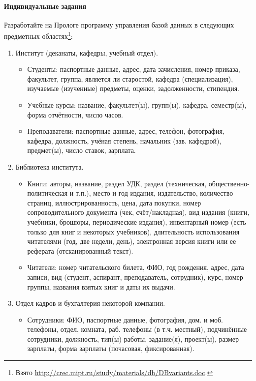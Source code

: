 \documentclass[12pt, openany, twoside]{book} %
\begin{document}
\paragraph{Индивидуальные задания}
Разработайте на Прологе программу управления базой данных в следующих предметных областях\footnote{Взято \url{http://crec.mipt.ru/study/materials/db/DBvariants.doc}.}:
\begin{enumerate}
\item Институт (деканаты, кафедры, учебный отдел).
\begin{itemize}
\item Студенты: паспортные данные, адрес, дата зачисления, номер приказа, факультет, группа, является ли старостой, кафедра (специализация), изучаемые (изученные) предметы, оценки, задолженности, стипендия.
\item Учебные курсы: название, факультет(ы), групп(ы), кафедра, семестр(ы), форма отчётности, число часов.
\item Преподаватели: паспортные данные, адрес, телефон, фотография, кафедра, должность, учёная степень, начальник (зав. кафедрой), предмет(ы), число ставок, зарплата.
\end{itemize}
\item Библиотека института.
\begin{itemize}
\item Книги: авторы, название, раздел УДК, раздел (техническая, общественно-политическая и т.п.), место и год издания, издательство, количество страниц, иллюстрированность, цена, дата покупки, номер сопроводительного документа (чек, счёт/накладная), вид издания (книги, учебники, брошюры, периодические издания), инвентарный номер (есть только для книг и некоторых учебников), длительность использования читателями (год, две недели, день), электронная версия книги или ее реферата (отсканированный текст).
\item Читатели: номер читательского билета, ФИО, год рождения, адрес, дата записи, вид (студент, аспирант, преподаватель, сотрудник), курс, номер группы, названия взятых книг и даты их выдачи.
\end{itemize}
\item Отдел кадров и бухгалтерия некоторой компании.
\begin{itemize}
\item Сотрудники: ФИО, паспортные данные, фотография, дом. и моб. телефоны, отдел, комната, раб. телефоны (в т.ч. местный), подчинённые сотрудники, должность, тип(ы) работы, задание(я), проект(ы), размер зарплаты, форма зарплаты (почасовая, фиксированная).

\end{itemize}
\end{enumerate}
\end{document}
